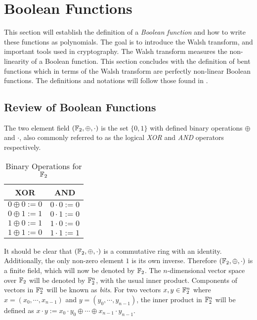 \section{Boolean Functions}\label{sec:boolean-functions}
\par This section will establish the definition of a {\em Boolean function}
and how to write these functions as polynomials. The goal is to introduce the
Walsh transform, and important tools used in cryptography. The Walsh transform
measures the non-linearity of a Boolean function. This section concludes with
the definition of bent functions which in terms of the Walsh transform are
perfectly non-linear Boolean functions. The definitions and
notations will follow those found in \cite{bk:cs09}.

\subsection{Review of Boolean Functions}
\par The two element field $(\mathbb{F}_2,\oplus,\cdot)$ is the set $\{0,1\}$
with defined binary operations $\oplus$ and $\cdot$, also commonly referred
to as the logical {\em XOR} and {\em AND} operators respectively.
\begin{table}[h!]
  \centering
  \begin{tabular}{|c|c|}
    \hline
    XOR&AND\\
    \hline
    $0\oplus0:=0$&$0\cdot0:=0$\\
    $0\oplus1:=1$&$0\cdot1:=0$\\
    $1\oplus0:=1$&$1\cdot0:=0$\\
    $1\oplus1:=0$&$1\cdot1:=1$\\
    \hline
  \end{tabular}
  \caption{Binary Operations for $\mathbb{F}_2$}
  \label{tab:GF(2)}
\end{table}
\par It should be clear that $(\mathbb{F}_2,\oplus,\cdot)$ is a commutative ring
with an identity. Additionally, the only non-zero element $1$ is its own
inverse. Therefore $(\mathbb{F}_2,\oplus,\cdot)$ is a finite field, which will now
be denoted by $\mathbb{F}_2$. The $n$-dimensional vector space over $\mathbb{F}_2$ will
be denoted by $\mathbb{F}_2^n$, with the usual inner product. Components of vectors in
$\mathbb{F}_2^n$ will be known as {\em bits}.
For two vectors $x,y\in\mathbb{F}_2^n$ where $x=(x_0,\cdots,x_{n-1})$ and
$y=(y_0,\cdots,y_{n-1})$, the inner product in $\mathbb{F}_2^n$ will be defined
as $x\cdot y:=\allowbreak x_0\cdot y_0 \oplus\allowbreak
\cdots \oplus\allowbreak x_{n-1}\cdot y_{n-1}$.

